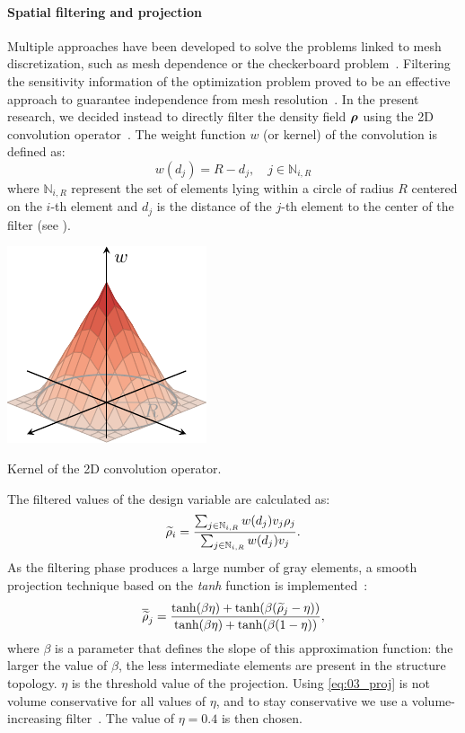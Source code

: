\paragraph{Spatial filtering and projection}
Multiple approaches have been developed to solve the problems linked to mesh discretization, such as mesh dependence or the checkerboard problem~. Filtering the sensitivity information of the optimization problem proved to be an effective approach to guarantee independence from mesh resolution~. In the present research, we decided instead to directly filter the density field $\bm{\rho}$ using the 2D convolution operator~. The weight function $w$ (or kernel) of the convolution is defined as:
\begin{equation}
    w(d_j) = R - d_j, \quad j \in \mathbb{N}_{i,R}
\end{equation} 
where $\mathbb{N}_{i,R}$ represent the set of elements lying within a circle of radius $R$ centered on the $i$-th element and $d_j$ is the distance of the $j$-th element to the center of the filter (see ).
\begin{marginfigure}
    \centering
    \includegraphics{figures/03_comparison_TO_TTO/02_circ_filter/filt_cir.pdf}
    \caption{Kernel of the 2D convolution operator.}
    \label{fig:03_ker}
\end{marginfigure} 
The filtered values of the design variable are calculated as:
\begin{equation}
    \widetilde{\rho}_i = \frac{\sum_{j \in \mathbb{N}_{i,R}} w(d_j)v_j\rho_j}{\sum_{j \in \mathbb{N}_{i,R}} w(d_j)v_j}.
    \label{eq:03_rhofil}
\end{equation}
As the filtering phase produces a large number of gray elements, a smooth projection technique based on the \textit{tanh} function is implemented~:
\begin{equation}
    \overline{\widetilde{\rho}}_j = \frac{\tanh(\beta\eta)+\tanh(\beta(\widetilde{\rho}_j - \eta))}{\tanh(\beta\eta)+\tanh(\beta(1 - \eta))},
    \label{eq:03_proj}
\end{equation}
where $\beta$ is a parameter that defines the slope of this approximation function: the larger the value of $\beta$, the less intermediate elements are present in the structure topology. $\eta$ is the threshold value of the projection. Using \eqref{eq:03_proj} is not volume conservative for all values of $\eta$, and to stay conservative we use a volume-increasing filter~. The value of $\eta = 0.4$ is then chosen.

